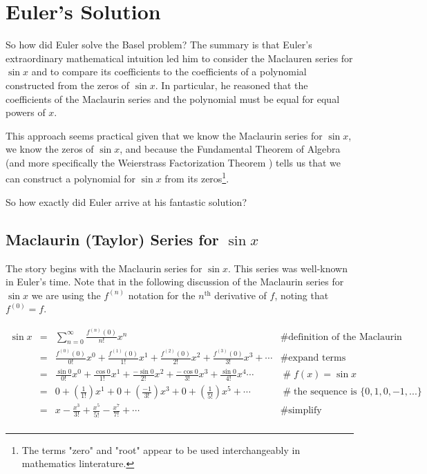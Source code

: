 \documentclass[11pt, oneside]{article}   	%
\begin{document}
\section{Euler's Solution}
\label{sec:eulers_solution}
So how did Euler solve the Basel problem? The summary is that
Euler's extraordinary mathematical intuition led him to consider
the Maclauren series \cite{wiki:taylor} for $\sin x$ and to
compare its coefficients to the coefficients of a polynomial
constructed from the zeros of $\sin x$.  In particular, he
reasoned that the coefficients of the Maclaurin series and the
polynomial must be equal for equal powers of $x$.

\bigskip
\noindent
This approach seems practical given that we know the Maclaurin
series for $\sin x$, we know the zeros of $\sin x$, and because
the Fundamental Theorem of Algebra \cite{wiki:ftoa} (and more
specifically the Weierstrass Factorization Theorem
\cite{wiki:weierstrass}) tells us that we can construct a
polynomial for $\sin x$ from its zeros\footnote{The terms "zero"
and "root" appear to be used interchangeably in mathematics
linterature.}.


\bigskip
\noindent
So how exactly did Euler arrive at his fantastic solution?

\subsection{Maclaurin (Taylor) Series for $\sin x$}
The story begins with the Maclaurin series \cite{wiki:taylor} for
$\sin x$. This series was well-known in Euler's time.  Note that
in the following discussion of the Maclaurin series for $\sin x$
we are using the $f^{(n)}$ notation for the $n^{\text{th}}$
derivative of $f$, noting that $f^{(0)} = f$.


\begin{equation*}
\begin{array}{lllll}
\sin x
&=& \sum\limits_{n=0}^{\infty} \frac{f^{(n)}(0)}{n!} x^n
        &\mathrel{\#} \text{definition of the Maclaurin series}  \\
[12pt]
&=& \frac{f^{(0)}(0)}{0!} x^0 +  \frac{f^{(1)}(0)}{1!} x^1 +
        \frac{f^{(2)}(0)}{2!} x^2 + \frac{f^{(3)}(0)}{3!} x^3 + \cdots
        &\mathrel{\#} \text{expand terms}                               \\
[12pt] 
&=& \frac{\sin 0}{0!}x^0 + \frac{\cos 0}{1!}x^1 +  \frac{-\sin
        0}{2!}x^2 +  \frac{-\cos 0}{3!}x^3 +  \frac{\sin 0}{4!} x^4 \cdots
        &\mathrel{\#} f(x) = \sin x \\ 
[12pt]
&=& 0 +  (\frac{1}{1!}) x^1 + 0 + (\frac{-1}{3!}) x^3+ 0 +
        (\frac{1}{5!}) x^5 + \cdots
        &\mathrel{\#} \text{the sequence is $\{0,1,0,-1,...\}$}   \\
[12pt]
&=&  x - \frac{x^3}{3!} + \frac{x^5}{5!}  - \frac{x^7}{7!} +
        \cdots
        &\mathrel{\#} \text{simplify} \\ 
\end{array}
\end{equation*}
\end{document}
